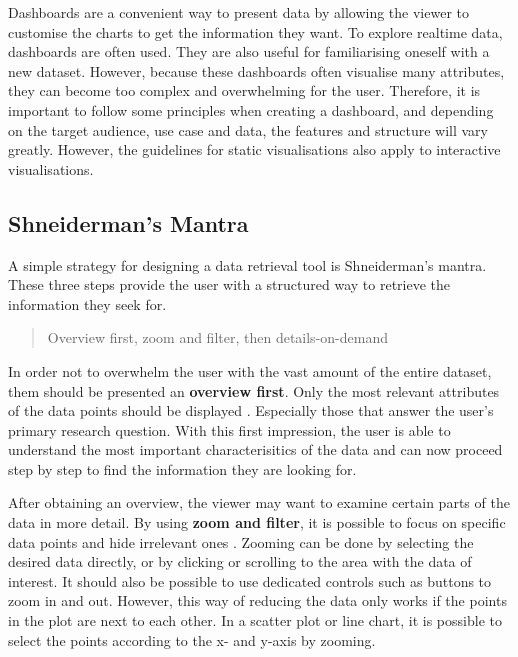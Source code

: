 \documentclass[11pt]{article}
\begin{document}
Dashboards are a convenient way to present data by allowing the viewer to customise the charts to get the information they want. To explore realtime data, dashboards are often used. They are also useful for familiarising oneself with a new dataset. However, because these dashboards often visualise many attributes, they can become too complex and overwhelming for the user. Therefore, it is important to follow some principles when creating a dashboard, and depending on the target audience, use case and data, the features and structure will vary greatly. However, the guidelines for static visualisations also apply to interactive visualisations.

\subsection{Shneiderman's Mantra}

A simple strategy for designing a data retrieval tool is Shneiderman's mantra. These three steps provide the user with a structured way to retrieve the information they seek for.

\begin{quote}
    Overview first, zoom and filter, then details-on-demand \parencite{shneiderman_thousand-fold_1997}
\end{quote}

In order not to overwhelm the user with the vast amount of the entire dataset, them should be presented an \textbf{overview first}. Only the most relevant attributes of the data points should be displayed \parencite{shneiderman_eyes_1996}. Especially those that answer the user's primary research question. With this first impression, the user is able to understand the most important characterisitics of the data and can now proceed step by step to find the information they are looking for.

After obtaining an overview, the viewer may want to examine certain parts of the data in more detail. By using \textbf{zoom and filter}, it is possible to focus on specific data points and hide irrelevant ones \parencite{shneiderman_eyes_1996}. Zooming can be done by selecting the desired data directly, or by clicking or scrolling to the area with the data of interest. It should also be possible to use dedicated controls such as buttons to zoom in and out. However, this way of reducing the data only works if the points in the plot are next to each other. In a scatter plot or line chart, it is possible to select the points according to the x- and y-axis by zooming.
\end{document}
